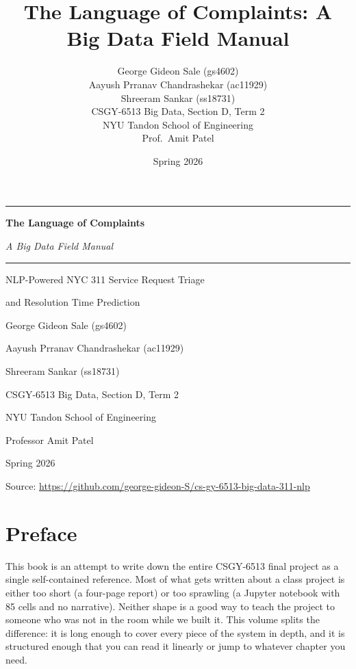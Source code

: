 \documentclass[11pt,letterpaper]{book}
\title{The Language of Complaints: A Big Data Field Manual}
\author{
  George Gideon Sale (gs4602) \\
  Aayush Prranav Chandrashekar (ac11929) \\
  Shreeram Sankar (ss18731) \\[0.5em]
  CSGY-6513 Big Data, Section D, Term 2 \\
  NYU Tandon School of Engineering \\
  Prof.\ Amit Patel
}
\date{Spring 2026}
\begin{document}
\frontmatter

\begin{titlepage}
\centering
\vspace*{1.5cm}
{\rule{\textwidth}{4pt}\par}
\vspace{0.4cm}
{\Huge\bfseries The Language of Complaints\par}
\vspace{0.2cm}
{\Large\itshape A Big Data Field Manual\par}
\vspace{0.4cm}
{\rule{\textwidth}{1pt}\par}
\vspace{1.5cm}
{\Large NLP-Powered NYC 311 Service Request Triage\par}
{\Large and Resolution Time Prediction\par}
\vspace{2cm}
{\large George Gideon Sale (gs4602)\par}
{\large Aayush Prranav Chandrashekar (ac11929)\par}
{\large Shreeram Sankar (ss18731)\par}
\vspace{1.5cm}
{\large CSGY-6513 Big Data, Section D, Term 2\par}
{\large NYU Tandon School of Engineering\par}
{\large Professor Amit Patel\par}
\vfill
{\large Spring 2026\par}
{\large Source: \url{https://github.com/george-gideon-S/cs-gy-6513-big-data-311-nlp}\par}
\end{titlepage}

\chapter*{Preface}

This book is an attempt to write down the entire CSGY-6513 final project as a single self-contained reference. Most of what gets written about a class project is either too short (a four-page report) or too sprawling (a Jupyter notebook with 85 cells and no narrative). Neither shape is a good way to teach the project to someone who was not in the room while we built it. This volume splits the difference: it is long enough to cover every piece of the system in depth, and it is structured enough that you can read it linearly or jump to whatever chapter you need.
\end{document}
